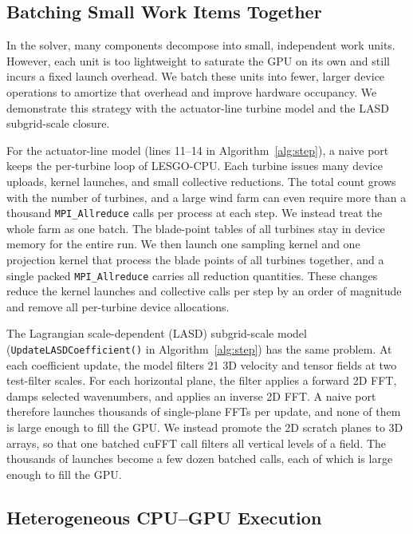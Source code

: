 \subsection{Batching Small Work Items Together}
\label{sec:opt-batch}

In the solver, many components decompose into small, independent work
units. However, each unit is too lightweight to saturate the GPU on its own
and still incurs a fixed launch overhead. We batch these
units into fewer, larger device operations to amortize that overhead and
improve hardware occupancy.
We demonstrate this strategy with the actuator-line turbine model and the LASD subgrid-scale closure.

For the actuator-line model (lines 11--14 in Algorithm~\ref{alg:step}), 
a naive port keeps the per-turbine loop of LESGO-CPU. 
Each turbine issues many device uploads,
kernel launches, and small collective reductions.
The total count grows with the number of turbines, and a
large wind farm can even require more than a thousand
\texttt{MPI\_Allreduce} calls per process at each step. We instead
treat the whole farm as one batch. The blade-point tables of all
turbines stay in device memory for the entire run. We then launch one sampling kernel
and one projection kernel that process the blade points of all turbines
together, and a single packed \texttt{MPI\_Allreduce} carries all
reduction quantities. These changes reduce the kernel launches and
collective calls per step by an order of magnitude and remove all
per-turbine device allocations.

The Lagrangian scale-dependent (LASD) subgrid-scale model (\texttt{UpdateLASDCoefficient()} in
Algorithm~\ref{alg:step}) has the same problem. At each coefficient
update, the model filters 21 3D velocity and tensor fields at two
test-filter scales. For
each horizontal plane, the filter applies a forward 2D FFT, damps
selected wavenumbers, and applies an inverse 2D FFT. A naive port
therefore launches thousands of single-plane FFTs per update, and none
of them is large enough to fill the GPU. We instead promote the 2D
scratch planes to 3D arrays, so that one batched cuFFT call filters all
vertical levels of a field. The thousands of launches become a
few dozen batched calls, each of which is large enough to fill the GPU.

\subsection{Heterogeneous CPU--GPU Execution}
\label{sec:opt-overlap}


